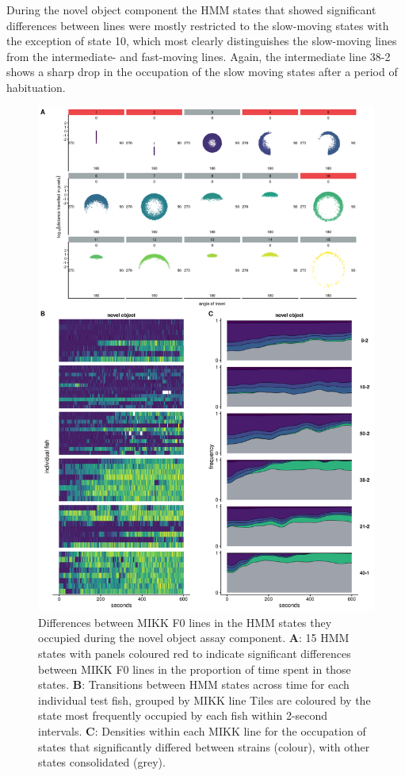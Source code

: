 \documentclass[
]{book}
\begin{document}
During the novel object component the HMM states that showed significant differences between lines were mostly restricted to the slow-moving states with the exception of state 10, which most clearly distinguishes the slow-moving lines from the intermediate- and fast-moving lines. Again, the intermediate line \textcolor{38-2_00C08B}{38-2} shows a sharp drop in the occupation of the slow moving states after a period of habituation.



\begin{figure}
\includegraphics[width=1\linewidth]{figs/mikk_behaviour/select_0.08_15_dge_no} \caption{Differences between MIKK F0 lines in the HMM states they occupied during the novel object assay component. \textbf{A}: 15 HMM states with panels coloured red to indicate significant differences between MIKK F0 lines in the proportion of time spent in those states. \textbf{B}: Transitions between HMM states across time for each individual test fish, grouped by MIKK line Tiles are coloured by the state most frequently occupied by each fish within 2-second intervals. \textbf{C}: Densities within each MIKK line for the occupation of states that significantly differed between strains (colour), with other states consolidated (grey).}\label{fig:F2-time-dge-no}
\end{figure}
\end{document}
